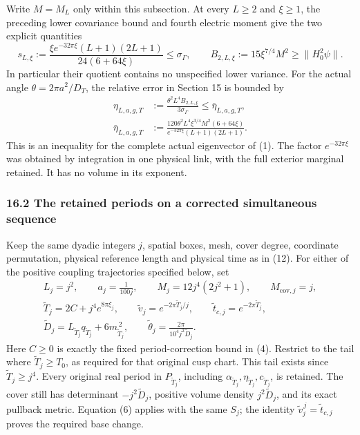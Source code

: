 \documentclass[
  11pt,
]{article}
\begin{document}
Write \(M=M_L\) only within this subsection. At every \(L\ge2\) and
\(\xi\ge1\), the preceding lower covariance bound and fourth electric
moment give the two explicit quantities \[
 s_{L,\xi}:=
 \frac{\xi e^{-32\pi\xi}(L+1)(2L+1)}{24(6+64\xi)}
 \le\sigma_\Gamma,
 \qquad B_{2,L,\xi}:=15\xi^{7/4}M^2\ge\|H_0^2\psi\|.
 \tag{171}
\] In particular their quotient contains no unspecified lower variance.
For the actual angle \(\theta=2\pi a^2/D_T\), the relative error in
Section 15 is bounded by \[
 \begin{split}
 \eta_{L,a,g,T}
 &:=\frac{\theta^2L^4B_{2,L,\xi}}{3\sigma_\Gamma}
 \le\bar\eta_{L,a,g,T},\\
 \bar\eta_{L,a,g,T}
 &:=\frac{120\theta^2L^4\xi^{3/4}M^2(6+64\xi)}
 {e^{-32\pi\xi}(L+1)(2L+1)} .
 \end{split}
 \tag{172}
\] This is an inequality for the complete actual eigenvector of (1). The
factor \(e^{-32\pi\xi}\) was obtained by integration in one physical
link, with the full exterior marginal retained. It has no volume in its
exponent.

\subsubsection{16.2 The retained periods on a corrected simultaneous
sequence}\label{the-retained-periods-on-a-corrected-simultaneous-sequence}

Keep the same dyadic integers \(j\), spatial boxes, mesh, cover degree,
coordinate permutation, physical reference length and physical time as
in (12). For either of the positive coupling trajectories specified
below, set \[
 \begin{gathered}
 L_j=j^2,\qquad a_j=\frac1{100j},\qquad
 M_j=12j^4(2j^2+1),\qquad M_{\mathrm{cov},j}=j,\\
 \widetilde T_j=2C+j^4e^{8\pi\xi_j},\qquad
 \widetilde v_j=e^{-2\pi\widetilde T_j/j},\qquad
 \widetilde t_{c,j}=e^{-2\pi\widetilde T_j},\\
 \widetilde D_j=L_{\widetilde T_j}q_{\widetilde T_j}
                    +6m_{\widetilde T_j}^{\,2},\qquad
 \widetilde\theta_j=\frac{2\pi}{10^4j^2\widetilde D_j}.
 \end{gathered}
 \tag{173}
\] Here \(C\ge0\) is exactly the fixed period-correction bound in (4).
Restrict to the tail where \(\widetilde T_j\ge T_0\), as required for
that original cusp chart. This tail exists since
\(\widetilde T_j\ge j^4\). Every original real period in
\(P_{\widetilde T_j}\), including
\(\alpha_{\widetilde T_j},\eta_{\widetilde T_j},c_{\widetilde T_j}\), is
retained. The cover still has determinant \(-j^2\widetilde D_j\),
positive volume density \(j^2\widetilde D_j\), and its exact pullback
metric. Equation (6) applies with the same \(S_j\); the identity
\(\widetilde v_j^{\,j}=\widetilde t_{c,j}\) proves the required base
change.
\end{document}
